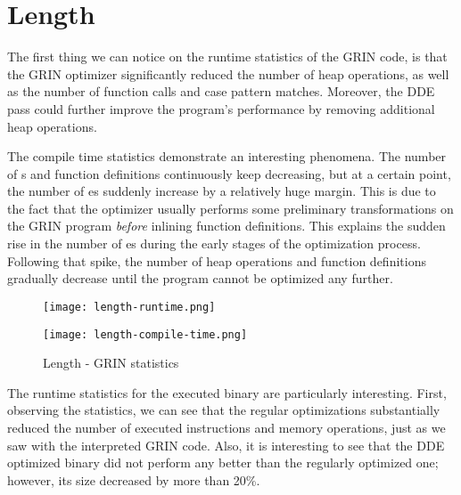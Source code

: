 \documentclass[main.tex]{subfiles}
\begin{document}
	
	\section{Length}
	
	The first thing we can notice on the runtime statistics of the GRIN code, is that the GRIN optimizer significantly reduced the number of heap operations, as well as the number of function calls and case pattern matches. Moreover, the DDE pass could further improve the program's performance by removing additional heap operations.
	
	The compile time statistics demonstrate an interesting phenomena. The number of s and function definitions continuously keep decreasing, but at a certain point, the number of es suddenly increase by a relatively huge margin. This is due to the fact that the optimizer usually performs some preliminary transformations on the GRIN program \emph{before} inlining function definitions. This explains the sudden rise in the number of es during the early stages of the optimization process. Following that spike, the number of heap operations and function definitions gradually decrease until the program cannot be optimized any further.
	
	\begin{figure}[h]
		\hspace{-0.5cm}
		\renewcommand{\figurename}{Diagram}
		\caption{Length - GRIN statistics}
		\label{diagram:length-stats}
		\addtocounter{figure}{-1}
		\begin{minipage}{0.5\textwidth}
			\label{diagram:length-stats-rt}
			\texttt{[image: length-runtime.png]}
		\end{minipage}
		\begin{minipage}{0.5\textwidth}
			\label{diagram:length-stats-ct}
			\texttt{[image: length-compile-time.png]}
		\end{minipage}
	\end{figure}

	The runtime statistics for the executed binary are particularly interesting. First, observing the  statistics, we can see that the regular optimizations substantially reduced the number of executed instructions and memory operations, just as we saw with the interpreted GRIN code. Also, it is interesting to see that the DDE optimized binary did not perform any better than the regularly optimized one;  however, its size decreased by more than 20\%. 
	
\end{document}
